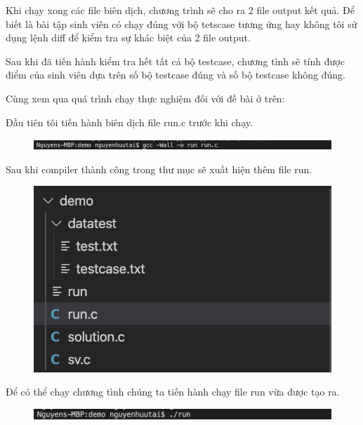 \documentclass[12pt,a4paper]{article}
\begin{document}
Khi chạy xong các file biên dịch, chương trình sẽ cho ra 2 file output kết quả. Để biết là bài tập sinh viên có chạy đúng với bộ tetscase tương ứng hay không tôi sử dụng lệnh diff để kiểm tra sự khác biệt của 2 file output.

Sau khi đã tiến hành kiểm tra hết tất cả bộ testcase, chương tình sẽ tính  được điểm của sinh viên dựa trên số bộ testcase đúng và số bộ testcase không đúng.

Cùng xem qua quá trình chạy thực nghiệm đối với đề bài ở trên:

Đầu tiên tôi tiến hành biên dịch file run.c trước khi chạy.

\begin{figure}[ht]
\begin{center}
\includegraphics[scale=.4]{hinhanh/compilerdemo.png}
\end{center}
\end{figure}

Sau khi compiler thành công trong thư mục sẽ xuất hiện thêm file run.

\begin{figure}[ht]
\begin{center}
\includegraphics[scale=.4]{hinhanh/cautrucsaucompiler.png}
\end{center}
\end{figure}

Để có thể chạy chương tình chúng ta tiến hành chạy file run vừa được tạo ra.

\begin{figure}[ht]
\begin{center}
\includegraphics[scale=.4]{hinhanh/rundemo.png}
\end{center}
\end{figure} \newpage
\end{document}
